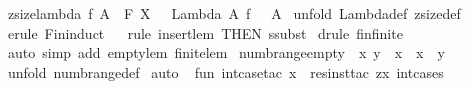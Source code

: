 \begin{isabellebody}
\isamarkupfalse%
%
\endisatagproof
{\isafoldproof}%
%
\isadelimproof
\isanewline
%
\endisadelimproof
\isanewline
{}\isamarkupfalse%
\ zsize{\isacharunderscore}lambda{\isacharcolon}\ {\isachardoublequoteopen}{\isacharbang}{\isacharbang}f{\isachardot}\ A\ {\isacharcolon}\ {\isacharpercent}F\ X\ {\isacharequal}{\isacharequal}{\isachargreater}\ {\isacharparenleft}{\isacharhash}\ {\isacharparenleft}Lambda\ A\ f{\isacharparenright}{\isacharparenright}\ {\isacharequal}\ {\isacharparenleft}{\isacharhash}\ A{\isacharparenright}{\isachardoublequoteclose}\isanewline
%
\isadelimproof
%
\endisadelimproof
%
\isatagproof
{}\isamarkupfalse%
\ {\isacharparenleft}unfold\ Lambda{\isacharunderscore}def\ zsize{\isacharunderscore}def{\isacharparenright}\isanewline
{}\isamarkupfalse%
\ {\isacharparenleft}erule\ Fin{\isacharunderscore}induct{\isacharparenright}\isanewline
{}\isamarkupfalse%
\ {}\isanewline
{}\isamarkupfalse%
\ {\isacharparenleft}rule\ insert{\isacharunderscore}lem\ {\isacharbrackleft}THEN\ ssubst{\isacharbrackright}{\isacharparenright}\isanewline
{}\isamarkupfalse%
\ {\isacharparenleft}drule\ fin{\isacharunderscore}finite{\isacharparenright}\isanewline
{}\isamarkupfalse%
\ {\isacharparenleft}auto\ simp\ add{\isacharcolon}\ empty{}{\isacharunderscore}lem\ finite{\isacharunderscore}lem{\isacharparenright}\isanewline
{}\isamarkupfalse%
%
\endisatagproof
{\isafoldproof}%
%
\isadelimproof
\isanewline
%
\endisadelimproof
\isanewline
{}\isamarkupfalse%
\ numb{\isacharunderscore}range{\isacharunderscore}empty{\isacharcolon}\ {\isachardoublequoteopen}{\isacharbang}{\isacharbang}\ x{\isachardot}\ y\ {\isacharless}\ x\ {\isacharequal}{\isacharequal}{\isachargreater}\ x\ {\isachardot}{\isachardot}\ y\ {\isacharequal}\ {\isacharbraceleft}{\isacharbraceright}{\isachardoublequoteclose}\isanewline
%
\isadelimproof
%
\endisadelimproof
%
\isatagproof
{}\isamarkupfalse%
\ {\isacharparenleft}unfold\ numb{\isacharunderscore}range{\isacharunderscore}def{\isacharparenright}\isanewline
{}\isamarkupfalse%
\ auto\isanewline
{}\isamarkupfalse%
%
\endisatagproof
{\isafoldproof}%
%
\isadelimproof
\isanewline
%
\endisadelimproof
%
\isadelimML
\isanewline
%
\endisadelimML
%
\isatagML
{}\isamarkupfalse%
\ {\isacharverbatimopen}\isanewline
fun\ int{\isacharunderscore}case{\isacharunderscore}tac\ x\ {\isacharequal}\ res{\isacharunderscore}inst{\isacharunderscore}tac\ {\isacharbrackleft}{\isacharparenleft}{\isachardoublequote}z{\isachardoublequote}{\isacharcomma}x{\isacharparenright}{\isacharbrackright}\ int{\isacharunderscore}cases{\isacharsemicolon}\isanewline

\end{isabellebody}
